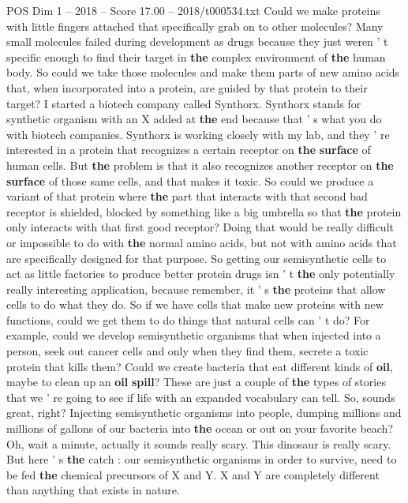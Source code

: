 \begin{textsample}{POS Dim 1 – 2018 – Score 17.00 – 2018/t000534.txt}
Could we make proteins with little fingers attached that specifically grab on to other molecules?
Many small molecules failed during development as drugs because they just weren ' t specific enough to find their target in \textbf{the} complex environment of \textbf{the} human body.
So could we take those molecules and make them parts of new amino acids that, when incorporated into a protein, are guided by that protein to their target?
I started a biotech company called Synthorx.
Synthorx stands for synthetic organism with an X added at \textbf{the} end because that ' s what you do with biotech companies.
Synthorx is working closely with my lab, and they ' re interested in a protein that recognizes a certain receptor on \textbf{the} \textbf{surface} of human cells.
But \textbf{the} problem is that it also recognizes another receptor on \textbf{the} \textbf{surface} of those same cells, and that makes it toxic.
So could we produce a variant of that protein where \textbf{the} part that interacts with that second bad receptor is shielded, blocked by something like a big umbrella so that \textbf{the} protein only interacts with that first good receptor?
Doing that would be really difficult or impossible to do with \textbf{the} normal amino acids, but not with amino acids that are specifically designed for that purpose.
So getting our semisynthetic cells to act as little factories to produce better protein drugs isn ' t \textbf{the} only potentially really interesting application, because remember, it ' s \textbf{the} proteins that allow cells to do what they do.
So if we have cells that make new proteins with new functions, could we get them to do things that natural cells can ' t do?
For example, could we develop semisynthetic organisms that when injected into a person, seek out cancer cells and only when they find them, secrete a toxic protein that kills them?
Could we create bacteria that eat different kinds of \textbf{oil}, maybe to clean up an \textbf{oil} \textbf{spill}?
These are just a couple of \textbf{the} types of stories that we ' re going to see if life with an expanded vocabulary can tell.
So, sounds great, right?
Injecting semisynthetic organisms into people, dumping millions and millions of gallons of our bacteria into \textbf{the} ocean or out on your favorite beach?
Oh, wait a minute, actually it sounds really scary.
This dinosaur is really scary.
But here ' s \textbf{the} catch : our semisynthetic organisms in order to survive, need to be fed \textbf{the} chemical precursors of X and Y.
X and Y are completely different than anything that exists in nature.

\end{textsample}
